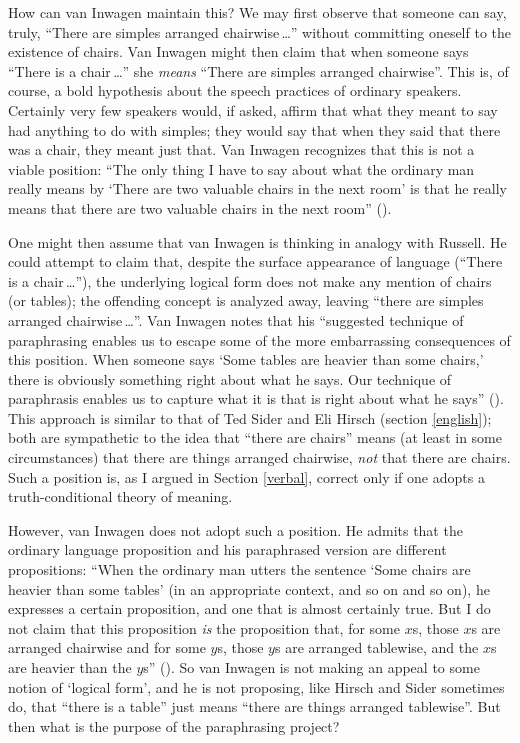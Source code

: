 \documentclass[11pt]{article}
\begin{document}
\begin{spacing}{1.5}
How can van Inwagen maintain this?  We may first observe that someone
can say, truly, ``There are simples arranged chairwise\,\ldots ''
without committing oneself to the existence of chairs.  Van Inwagen
might then claim that when someone says ``There is a chair\,\ldots ''
she {\em means} ``There are simples arranged chairwise''.  This is, of
course, a bold hypothesis about the speech practices of ordinary
speakers.  Certainly very few speakers would, if asked, affirm that
what they meant to say had anything to do with simples; they would say
that when they said that there was a chair, they meant just that.  Van
Inwagen recognizes that this is not a viable position: ``The only
thing I have to say about what the ordinary man really means by `There
are two valuable chairs in the next room' is that he really means that
there are two valuable chairs in the next room''
(\citeyear[106]{inwagen1995}).

One might then assume that van Inwagen is thinking in analogy with
Russell.  He could attempt to claim that, despite the surface
appearance of language (``There is a chair\,\ldots ''), the underlying
logical form does not make any mention of chairs (or tables); the
offending concept is analyzed away, leaving ``there are simples
arranged chairwise\,\ldots ''.  Van Inwagen notes that his ``suggested
technique of paraphrasing enables us to escape some of the more
embarrassing consequences of this position.  When someone says `Some
tables are heavier than some chairs,' there is obviously something
right about what he says.  Our technique of paraphrasis enables us to
capture what it is that is right about what he says''
(\citeyear[111]{inwagen1995}).  This approach is similar to that of
Ted Sider and Eli Hirsch (section \ref{english}); both are sympathetic
to the idea that ``there are chairs'' means (at least in some
circumstances) that there are things arranged chairwise, {\em not}
that there are chairs.  Such a position is, as I argued in Section
\ref{verbal}, correct only if one adopts a truth-conditional theory of
meaning.

However, van Inwagen does not adopt such a position.  He admits that
the ordinary language proposition and his paraphrased version are
different propositions: ``When the ordinary man utters the sentence
`Some chairs are heavier than some tables' (in an appropriate context,
and so on and so on), he expresses a certain proposition, and one that
is almost certainly true.  But I do not claim that this proposition
{\em is} the proposition that, for some $x$s, those $x$s are arranged
chairwise and for some $y$s, those $y$s are arranged tablewise, and
the $x$s are heavier than the $y$s'' (\citeyear[112]{inwagen1995}).
So van Inwagen is not making an appeal to some notion of `logical
form', and he is not proposing, like Hirsch and Sider sometimes do,
that ``there is a table'' just means ``there are things arranged
tablewise''.  But then what is the purpose of the paraphrasing
project?


\end{spacing}
\end{document}
